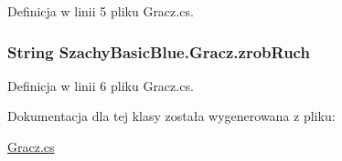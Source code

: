 Definicja w linii 5 pliku Gracz.\-cs.

\hypertarget{class_szachy_basic_blue_1_1_gracz_a197b73341a7fd21ebe1f036f12c02bd3}{
\subsubsection[{zrob\-Ruch}]{\setlength{\rightskip}{0pt plus 5cm}String Szachy\-Basic\-Blue.\-Gracz.\-zrob\-Ruch}}\label{class_szachy_basic_blue_1_1_gracz_a197b73341a7fd21ebe1f036f12c02bd3}


Definicja w linii 6 pliku Gracz.\-cs.



Dokumentacja dla tej klasy została wygenerowana z pliku\-:\begin{DoxyCompactItemize}
\item 
\hyperlink{_gracz_8cs}{Gracz.\-cs}\end{DoxyCompactItemize}
